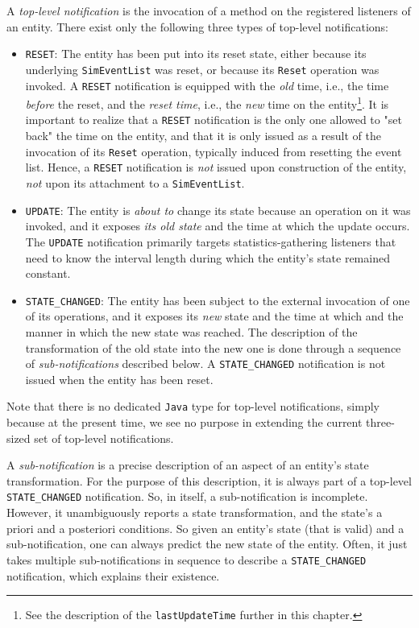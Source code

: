 A {\em top-level notification\/} is the invocation
  of a method on the registered listeners of an entity.
There exist only the following three types of top-level
  notifications:
\begin{itemize}
\item \lstinline|RESET|:
  The entity has been put into its reset state,
    either because its underlying \lstinline|SimEventList|
    was reset, or because its \lstinline|Reset|
    operation was invoked.
  A \lstinline|RESET| notification is equipped with
    the {\em old\/} time, i.e.,
    the time {\em before\/} the reset,
    and the {\em reset time\/},
    i.e., the {\em new\/} time on the entity\footnote{
    See the description of the \lstinline|lastUpdateTime|
    further in this chapter.}.
  It is important to realize that a \lstinline|RESET|
    notification is the only one allowed to
    "set back" the time on the entity,
    and that it is only issued as a result
    of the invocation of its \lstinline|Reset|
    operation, typically induced from resetting the event list.
  Hence,
    a \lstinline|RESET| notification is {\em not\/}
    issued upon construction of the entity,
    {\em not\/} upon its attachment to a \lstinline|SimEventList|.
\item \lstinline|UPDATE|:
  The entity is {\em about to\/} change its state
    because an operation on it was invoked,
    and it exposes {\em its old state\/}
    and the time at which the update occurs.
  The \lstinline|UPDATE| notification
    primarily targets statistics-gathering listeners
    that need to know the interval length during
    which the entity's state remained constant.
\item \lstinline|STATE_CHANGED|:
  The entity has been subject to the external
    invocation of one of its operations,
    and it exposes its {\em new\/} state
    and the time at which and the manner in which
    the new state was reached.
  The description of the transformation of the old state
    into the new one is done through a sequence
    of {\em sub-notifications\/} described below.
  A \lstinline|STATE_CHANGED| notification
    is not issued when the entity has been reset.
\end{itemize}
Note that there is no dedicated \lstinline|Java| type
  for top-level notifications,
  simply because at the present time,
  we see no purpose in extending
  the current three-sized set of top-level notifications.

A {\em sub-notification\/} is a precise description
  of an aspect of an entity's state transformation.
For the purpose of this description,
  it is always part of a top-level \lstinline|STATE_CHANGED|
  notification.
So, in itself,
  a sub-notification is incomplete.
However, it unambiguously reports
  a state transformation,
  and the state's a priori and a posteriori
  conditions.
So given an entity's state
  (that is valid)
  and a sub-notification,
  one can always predict
  the new state of the entity.
Often,
  it just takes multiple sub-notifications in sequence
  to describe a \lstinline|STATE_CHANGED| notification,
  which explains their existence.
  
